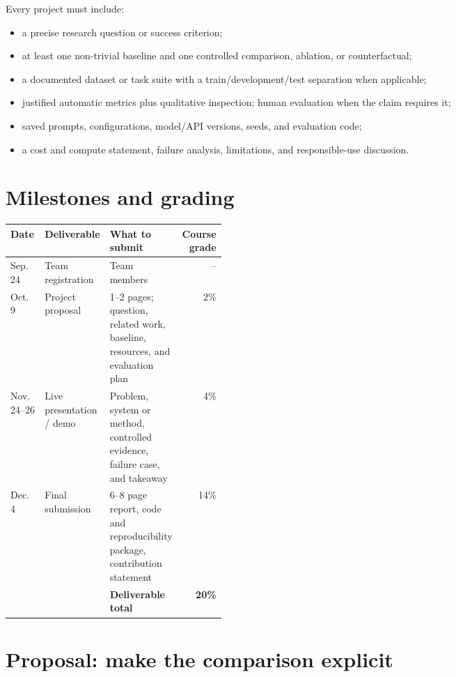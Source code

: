 \documentclass[11pt]{article}
\begin{document}
Every project must include:

\begin{itemize}
  \item a precise research question or success criterion;
  \item at least one non-trivial baseline and one controlled comparison, ablation, or counterfactual;
  \item a documented dataset or task suite with a train/development/test separation when applicable;
  \item justified automatic metrics plus qualitative inspection; human evaluation when the claim requires it;
  \item saved prompts, configurations, model/API versions, seeds, and evaluation code;
  \item a cost and compute statement, failure analysis, limitations, and responsible-use discussion.
\end{itemize}

\section{Milestones and grading}

\begin{center}
\begin{tabularx}{\linewidth}{@{}p{0.16\linewidth}p{0.20\linewidth}Xr@{}}
\toprule
\textbf{Date} & \textbf{Deliverable} & \textbf{What to submit} & \textbf{Course grade}\\
\midrule
Sep. 24 & Team registration & Team members & --\\
Oct. 9 & Project proposal & 1--2 pages; question, related work, baseline, resources, and evaluation plan & 2\%\\
Nov. 24--26 & Live presentation / demo & Problem, system or method, controlled evidence, failure case, and takeaway & 4\%\\
Dec. 4 & Final submission & 6--8 page report, code and reproducibility package, contribution statement & 14\%\\
\midrule
 & & \textbf{Deliverable total} & \textbf{20\%}\\
\bottomrule
\end{tabularx}
\end{center}

\section{Proposal: make the comparison explicit}
\end{document}
